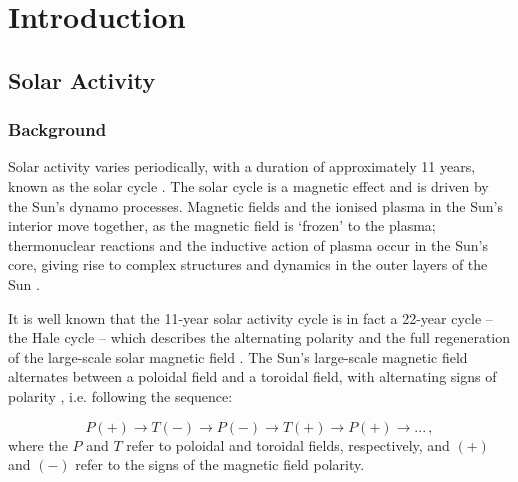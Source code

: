 \chapter{Introduction}\label{chap:intro}




\section{Solar Activity}\label{sec:intro_activity}

\subsection{Background}

Solar activity varies periodically, with a duration of approximately 11 years, known as the solar cycle \citep{hathaway_solar_2015}. The solar cycle is a magnetic effect and is driven by the Sun's dynamo processes. Magnetic fields and the ionised plasma in the Sun's interior move together, as the magnetic field is `frozen' to the plasma; thermonuclear reactions and the inductive action of plasma occur in the Sun's core, giving rise to complex structures and dynamics in the outer layers of the Sun \citep{charbonneau_dynamo_2020}.

It is well known that the 11-year solar activity cycle is in fact a 22-year cycle -- the Hale cycle -- which describes the alternating polarity and the full regeneration of the large-scale solar magnetic field \citep{hathaway_solar_2015, charbonneau_dynamo_2020}. The Sun's large-scale magnetic field alternates between a poloidal field and a toroidal field, with alternating signs of polarity \citep{charbonneau_dynamo_2020}, i.e. following the sequence:

\begin{equation}
P(+) \rightarrow T(-) \rightarrow P(-) \rightarrow T(+) \rightarrow P(+) \rightarrow ... \, ,
\label{eq:solar_cycle_dynamo}
\end{equation}
%
where the $P$ and $T$ refer to poloidal and toroidal fields, respectively, and $(+)$ and $(-)$ refer to the signs of the magnetic field polarity.

